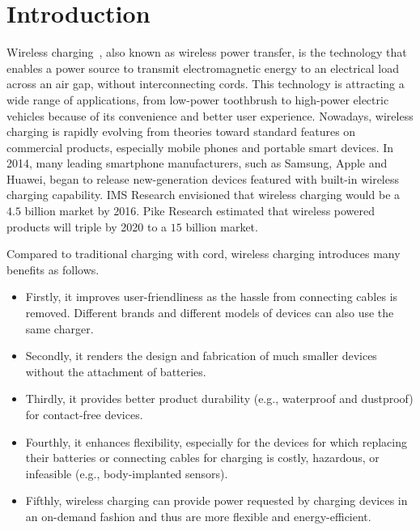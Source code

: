 \documentclass[twocolumn,10pt]{IEEEtran}
\begin{document}
\section{Introduction}

 
Wireless charging~\cite{A.2014Costanzo,J.2013Garnica}, also known as wireless power transfer, is the technology that enables a power source to transmit electromagnetic energy to an electrical load across an air gap, without interconnecting cords. This technology is attracting a wide range of applications, from low-power toothbrush to high-power electric vehicles because of its convenience and better user experience.  Nowadays, wireless charging is rapidly evolving from theories toward standard features on commercial products, especially mobile phones and portable smart devices. In 2014, many leading smartphone manufacturers, such as Samsung, Apple and Huawei, began to release new-generation devices featured with built-in wireless charging capability. IMS Research \cite{imsresearch} envisioned that wireless charging would be a $4.5$ billion market by 2016. Pike Research \cite{pikeresearch} estimated that wireless powered products will triple by 2020 to a $15$ billion market.
 





Compared to traditional charging with cord, wireless charging introduces many benefits as follows.
\begin{itemize}
\item Firstly, it improves user-friendliness as the hassle from connecting cables is removed. Different brands and different models of devices can also use the same charger.
 
\item  Secondly, it renders the design and fabrication of much smaller devices without the attachment of batteries. 
 
\item  Thirdly, it provides better product durability (e.g., waterproof and dustproof) for contact-free devices. 
  
\item  Fourthly, it enhances flexibility, especially for the devices for which replacing their batteries or connecting cables for charging is costly, hazardous, or infeasible (e.g., body-implanted sensors). 
  
\item Fifthly, wireless charging can provide power requested by charging devices in an on-demand fashion and thus are more flexible and energy-efficient. 

\end{itemize} 
\end{document}
